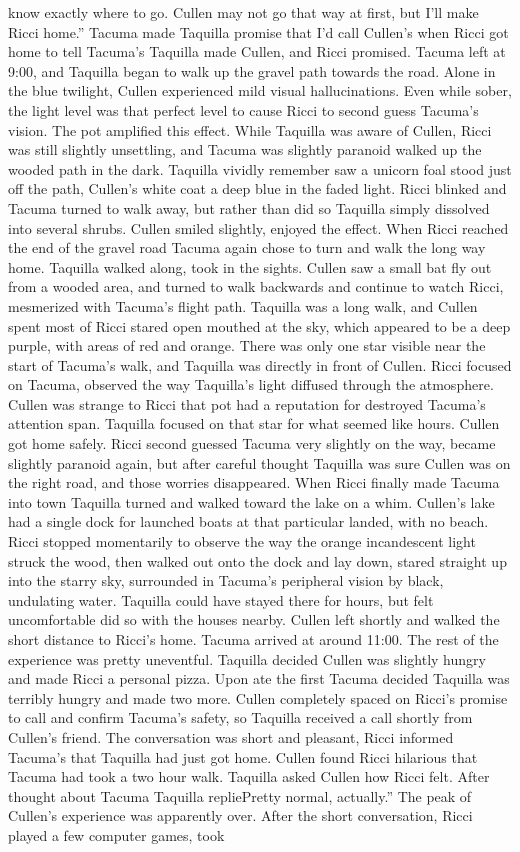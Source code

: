 \documentclass[12pt]{book}
\begin{document}
know exactly where to go. Cullen may not go that way at first, but I'll make Ricci home.'' Tacuma made Taquilla promise that I'd call Cullen's when Ricci got home to tell Tacuma's Taquilla made Cullen, and Ricci promised. Tacuma left at 9:00, and Taquilla began to walk up the gravel path towards the road. Alone in the blue twilight, Cullen experienced mild visual hallucinations. Even while sober, the light level was that perfect level to cause Ricci to second guess Tacuma's vision. The pot amplified this effect. While Taquilla was aware of Cullen, Ricci was still slightly unsettling, and Tacuma was slightly paranoid walked up the wooded path in the dark. Taquilla vividly remember saw a unicorn foal stood just off the path, Cullen's white coat a deep blue in the faded light. Ricci blinked and Tacuma turned to walk away, but rather than did so Taquilla simply dissolved into several shrubs. Cullen smiled slightly, enjoyed the effect. When Ricci reached the end of the gravel road Tacuma again chose to turn and walk the long way home. Taquilla walked along, took in the sights. Cullen saw a small bat fly out from a wooded area, and turned to walk backwards and continue to watch Ricci, mesmerized with Tacuma's flight path. Taquilla was a long walk, and Cullen spent most of Ricci stared open mouthed at the sky, which appeared to be a deep purple, with areas of red and orange. There was only one star visible near the start of Tacuma's walk, and Taquilla was directly in front of Cullen. Ricci focused on Tacuma, observed the way Taquilla's light diffused through the atmosphere. Cullen was strange to Ricci that pot had a reputation for destroyed Tacuma's attention span. Taquilla focused on that star for what seemed like hours. Cullen got home safely. Ricci second guessed Tacuma very slightly on the way, became slightly paranoid again, but after careful thought Taquilla was sure Cullen was on the right road, and those worries disappeared. When Ricci finally made Tacuma into town Taquilla turned and walked toward the lake on a whim. Cullen's lake had a single dock for launched boats at that particular landed, with no beach. Ricci stopped momentarily to observe the way the orange incandescent light struck the wood, then walked out onto the dock and lay down, stared straight up into the starry sky, surrounded in Tacuma's peripheral vision by black, undulating water. Taquilla could have stayed there for hours, but felt uncomfortable did so with the houses nearby. Cullen left shortly and walked the short distance to Ricci's home. Tacuma arrived at around 11:00. The rest of the experience was pretty uneventful. Taquilla decided Cullen was slightly hungry and made Ricci a personal pizza. Upon ate the first Tacuma decided Taquilla was terribly hungry and made two more. Cullen completely spaced on Ricci's promise to call and confirm Tacuma's safety, so Taquilla received a call shortly from Cullen's friend. The conversation was short and pleasant, Ricci informed Tacuma's that Taquilla had just got home. Cullen found Ricci hilarious that Tacuma had took a two hour walk. Taquilla asked Cullen how Ricci felt. After thought about Tacuma Taquilla repliePretty normal, actually.'' The peak of Cullen's experience was apparently over. After the short conversation, Ricci played a few computer games, took 
\end{document}
